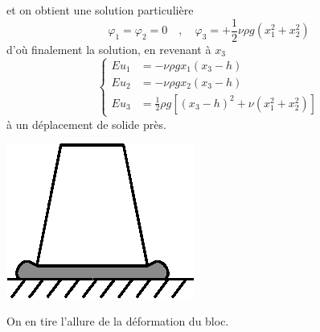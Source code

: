 et on obtient une solution particulière
\begin{equation}
    \varphi_1 = \varphi_2 = 0 \quad,\quad \varphi_3 = + \frac{1}{2}\nu\rho g \left( x_1^2 + x_2^2 \right)
    \label{eq:Ch06-040}
\end{equation}
d'où finalement la solution, en revenant à $x_3$
\begin{equation}
    \left\{
    \begin{aligned}
        E u_1 & = -\nu \rho g x_1 \left( x_3 - h \right) \\
        E u_2 & = -\nu \rho g x_2 \left( x_3 - h \right) \\
        E u_3 & = \frac{1}{2} \rho g \left[ \left( x_3 - h \right)^2 + \nu \left( x_1^2 + x_2^2 \right)  \right]
    \end{aligned}
    \right.
    \label{eq:Ch06-041}
\end{equation}
à un déplacement de solide près.
\begin{multicols}{2}
    \begin{center}
        \includegraphics{../images/T1_Ch06-02}
    \end{center}
    \columnbreak
    On en tire l'allure de la déformation du bloc.
\end{multicols}

